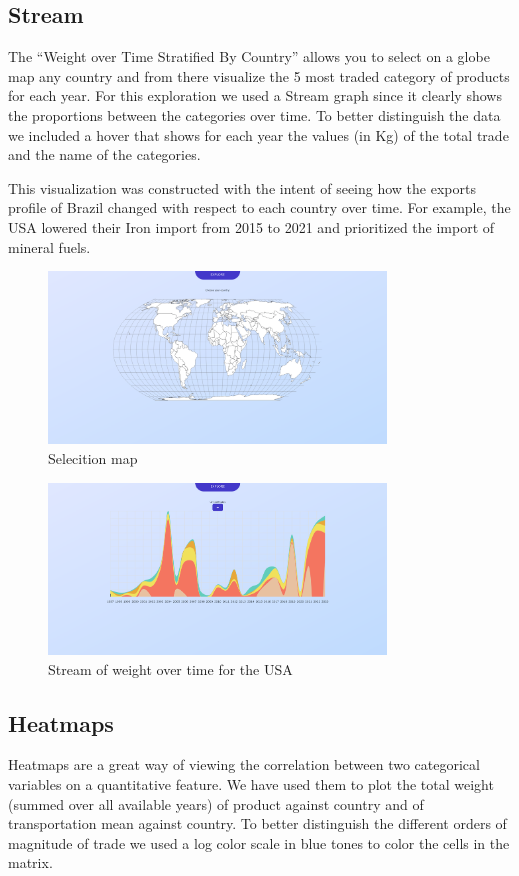 \documentclass[12pt,a4]{article}
\begin{document}
\subsection{Stream}
The “Weight over Time Stratified By Country” allows you to select on a globe map any country and from there visualize the 5 most traded category of products for each year. For this exploration we used a Stream graph since it clearly shows the proportions between the categories over time. To better distinguish the data we included a hover that shows for each year the values (in Kg) of the total trade and the name of the categories. 

This visualization was constructed with the intent of seeing how the exports profile of Brazil changed with respect to each country over time. For example, the USA lowered their Iron import from 2015 to 2021 and prioritized the import of mineral fuels.

\begin{figure}[H]
    \centering
    \includegraphics[width=0.8\textwidth]{stream1.png}
    \caption{Selecition map}
\end{figure}

\begin{figure}[H]
    \centering
    \includegraphics[width=0.8\textwidth]{stream2.png}
    \caption{Stream of weight over time for the USA}
\end{figure}

\subsection{Heatmaps}
Heatmaps are a great way of viewing the correlation between two categorical variables on a quantitative feature. We have used them to plot the total weight (summed over all available years) of product against country and of transportation mean against country. To better distinguish the different orders of magnitude of trade we used a log color scale in blue tones to color the cells in the matrix.
\end{document}
